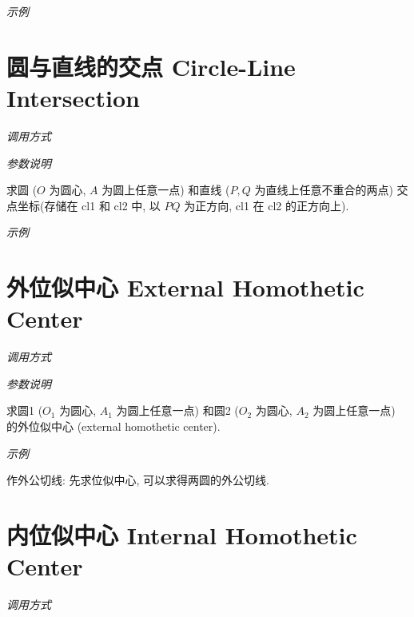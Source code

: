 \emph{示例}


\section{圆与直线的交点 Circle-Line Intersection}

\emph{调用方式}

\begin{tcolorbox}{}
\end{tcolorbox}

\emph{参数说明}

求圆 ($O$ 为圆心, $A$ 为圆上任意一点)
和直线 ($P,Q$ 为直线上任意不重合的两点) 
交点坐标(存储在 cl1 和 cl2 中, 以 $PQ$ 为正方向, cl1 在 cl2 的正方向上).

\emph{示例}


\section{外位似中心 External Homothetic Center}

\emph{调用方式}

\begin{tcolorbox}{}
\end{tcolorbox}

\emph{参数说明}

求圆1 ($O_1$ 为圆心, $A_1$ 为圆上任意一点)
和圆2 ($O_2$ 为圆心, $A_2$ 为圆上任意一点) 
的外位似中心 (external homothetic center)\cite{HOMO}.

\emph{示例}

作外公切线: 先求位似中心, 可以求得两圆的外公切线.


\section{内位似中心 Internal Homothetic Center}

\emph{调用方式}

\begin{tcolorbox}{}
\end{tcolorbox}

